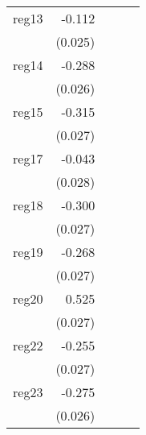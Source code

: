 {\begin{longtable}{l*{4}{D{.}{.}{-1}}}
\addlinespace
reg13       &      -0.112\sym{***}&                     &                     &                     \\
            &     (0.025)         &                     &                     &                     \\
\addlinespace
reg14       &      -0.288\sym{***}&                     &                     &                     \\
            &     (0.026)         &                     &                     &                     \\
\addlinespace
reg15       &      -0.315\sym{***}&                     &                     &                     \\
            &     (0.027)         &                     &                     &                     \\
\addlinespace
reg17       &      -0.043         &                     &                     &                     \\
            &     (0.028)         &                     &                     &                     \\
\addlinespace
reg18       &      -0.300\sym{***}&                     &                     &                     \\
            &     (0.027)         &                     &                     &                     \\
\addlinespace
reg19       &      -0.268\sym{***}&                     &                     &                     \\
            &     (0.027)         &                     &                     &                     \\
\addlinespace
reg20       &       0.525\sym{***}&                     &                     &                     \\
            &     (0.027)         &                     &                     &                     \\
\addlinespace
reg22       &      -0.255\sym{***}&                     &                     &                     \\
            &     (0.027)         &                     &                     &                     \\
\addlinespace
reg23       &      -0.275\sym{***}&                     &                     &                     \\
            &     (0.026)         &                     &                     &                     \\

\end{longtable}}
